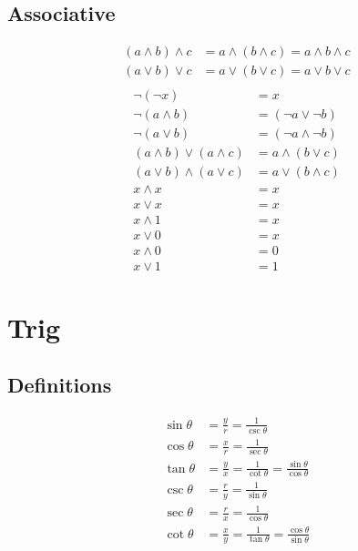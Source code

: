 \documentclass{report}
\def\true{1} %
\def\false{0} %
\theoremstyle{mytheoremstyle}
\theoremstyle{mytheoremstyle}
\theoremstyle{myproblemstyle}
\begin{document}
    \subsection{Associative}
    \begin{align}
        (a \land b) \land c &= a \land (b \land c) = a \land b \land c \\
        (a \lor b) \lor c &= a \lor (b \lor c) = a \lor b \lor c \\
    \end{align}
    \begin{align}
        \lnot(\lnot x) &= x \\
        \lnot(a \land b) &= (\lnot a \lor \lnot b) \\
        \lnot(a \lor b) &= (\lnot a \land \lnot b) \\
        (a \land b) \lor (a \land c) &= a \land (b \lor c) \\
        (a \lor b) \land (a \lor c) &= a \lor (b \land c) \\
        x \land x &= x \\
        x \lor x &= x \\
        x \land \true &= x \\
        x \lor \false &= x \\
        x \land \false &= \false \\
        x \lor \true &= \true
    \end{align}

    \section{Trig}
    \subsection{Definitions}
    \begin{align}
        \sin\theta &= \frac{y}{r} = \frac{1}{\csc\theta} \\
        \cos\theta &= \frac{x}{r} = \frac{1}{\sec\theta} \\
        \tan\theta &= \frac{y}{x} = \frac{1}{\cot\theta} = \frac{\sin\theta}{\cos\theta} \\
        \csc\theta &= \frac{r}{y} = \frac{1}{\sin\theta} \\
        \sec\theta &= \frac{r}{x} = \frac{1}{\cos\theta} \\
        \cot\theta &= \frac{x}{y} = \frac{1}{\tan\theta} = \frac{\cos\theta}{\sin\theta}
    \end{align}
\end{document}
